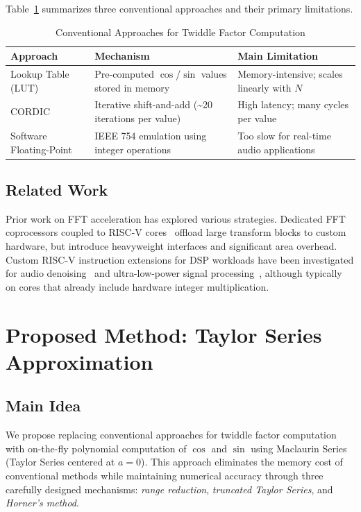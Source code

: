 \documentclass[conference]{IEEEtran}
\begin{document}
Table~\ref{tab:conventional} summarizes three conventional approaches and their
primary limitations.

\begin{table}[!t]
\caption{Conventional Approaches for Twiddle Factor Computation}
\label{tab:conventional}
\centering
\renewcommand{\arraystretch}{1.3}
\begin{tabular}{p{2cm}|p{2.5cm}|p{2.5cm}}
\toprule
\textbf{Approach} & \textbf{Mechanism} & \textbf{Main Limitation} \\
\midrule
Lookup Table (LUT) & Pre-computed $\cos$/$\sin$ values stored in memory &
Memory-intensive; scales linearly with $N$ \\
\midrule
CORDIC & Iterative shift-and-add (\textasciitilde20 iterations per value) & High
latency; many cycles per value \\
\midrule
Software Floating-Point & IEEE 754 emulation using integer operations & Too slow
for real-time audio applications \\
\bottomrule
\end{tabular}
\end{table}

\subsection{Related Work}

Prior work on FFT acceleration has explored various strategies. Dedicated FFT
coprocessors coupled to RISC-V cores~\cite{cao2025,hu2021} offload large
transform blocks to custom hardware, but introduce heavyweight interfaces and
significant area overhead. Custom RISC-V instruction extensions for DSP
workloads have been investigated for audio denoising~\cite{yuan2022} and
ultra-low-power signal processing~\cite{belhadj2022}, although typically on
cores that already include hardware integer multiplication.

\section{Proposed Method: Taylor Series Approximation}
\label{sec:method}

\subsection{Main Idea}

We propose replacing conventional approaches for twiddle factor computation with
on-the-fly polynomial computation of $\cos$ and $\sin$ using Maclaurin Series
(Taylor Series centered at $a = 0$). This approach eliminates the memory cost of
conventional methods while maintaining numerical accuracy through three
carefully designed mechanisms: \textit{range reduction}, \textit{truncated
Taylor Series}, and \textit{Horner's method}.
\end{document}
